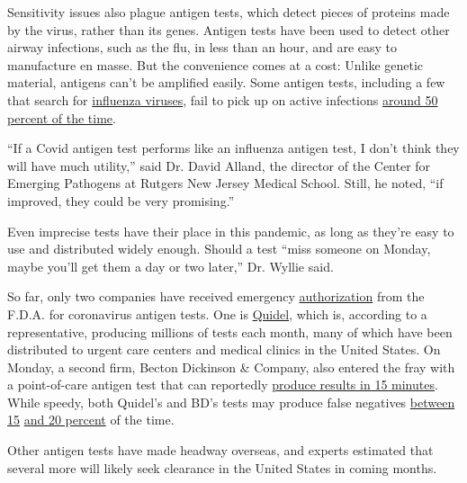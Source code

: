 Sensitivity issues also plague antigen tests, which detect pieces of
proteins made by the virus, rather than its genes. Antigen tests have
been used to detect other airway infections, such as the flu, in less
than an hour, and are easy to manufacture en masse. But the convenience
comes at a cost: Unlike genetic material, antigens can't be amplified
easily. Some antigen tests, including a few that search for
\href{https://www.cdc.gov/flu/professionals/diagnosis/clinician_guidance_ridt.htm}{influenza
viruses}, fail to pick up on active infections
\href{https://www.cdc.gov/flu/professionals/diagnosis/clinician_guidance_ridt.htm}{around
50 percent of the time}.

``If a Covid antigen test performs like an influenza antigen test, I
don't think they will have much utility,'' said Dr. David Alland, the
director of the Center for Emerging Pathogens at Rutgers New Jersey
Medical School. Still, he noted, ``if improved, they could be very
promising.''

Even imprecise tests have their place in this pandemic, as long as
they're easy to use and distributed widely enough. Should a test ``miss
someone on Monday, maybe you'll get them a day or two later,'' Dr.
Wyllie said.

So far, only two companies have received emergency
\href{https://www.fda.gov/news-events/press-announcements/coronavirus-covid-19-update-fda-authorizes-first-antigen-test-help-rapid-detection-virus-causes}{authorization}
from the F.D.A. for coronavirus antigen tests. One is
\href{https://www.nytimes.com/2020/05/09/health/antigen-testing-fda-coronavirus.html}{Quidel},
which is, according to a representative, producing millions of tests
each month, many of which have been distributed to urgent care centers
and medical clinics in the United States. On Monday, a second firm,
Becton Dickinson \& Company, also entered the fray with a point-of-care
antigen test that can reportedly
\href{https://www.nytimes.com/reuters/2020/07/06/us/06reuters-health-coronavirus-becton-dickinson.html}{produce
results in 15 minutes}. While speedy, both Quidel's and BD's tests may
produce false negatives
\href{https://investors.bd.com/news-releases/news-release-details/bd-launches-portable-rapid-point-care-antigen-test-detect-sars}{between
15}
\href{https://www.sciencemag.org/news/2020/05/coronavirus-antigen-tests-quick-and-cheap-too-often-wrong}{and
20 percent} of the time.

Other antigen tests have made headway overseas, and experts estimated
that several more will likely seek clearance in the United States in
coming months.

